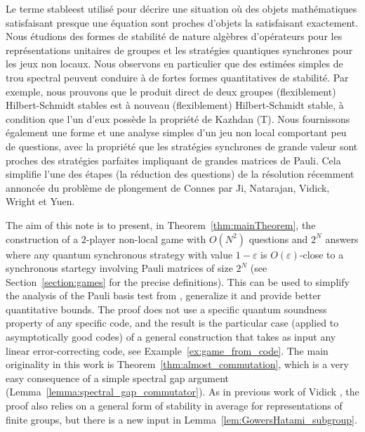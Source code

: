 \documentclass[JEP,XML,SOM,Unicode,published]{cedram}
\theoremstyle{plain}
\theoremstyle{definition}
\begin{document}
\begin{altabstract}
Le terme \og stable\fg est utilisé pour décrire une situation où des objets mathématiques satisfaisant presque une équation sont proches d'objets la satisfaisant exactement. Nous étudions des formes de stabilité de nature algèbres d'opérateurs pour les représentations unitaires de groupes et les stratégies quantiques synchrones pour les jeux non locaux. Nous observons en particulier que des estimées simples de trou spectral peuvent conduire à de fortes formes quantitatives de stabilité. Par exemple, nous prouvons que le produit direct de deux groupes (flexiblement) Hilbert-Schmidt stables est à nouveau (flexiblement) Hilbert-Schmidt stable, à condition que l'un d'eux possède la propriété de Kazhdan (T). Nous fournissons également une forme et une analyse simples d'un jeu non local comportant peu de questions, avec la propriété que les stratégies synchrones de grande valeur sont proches des stratégies parfaites impliquant de grandes matrices de Pauli. Cela simplifie l'une des étapes (la réduction des questions) de la résolution récemment annoncée du problème de plongement de Connes par Ji, Natarajan, Vidick, Wright et Yuen.
\end{altabstract}
\maketitle

\noindent
\begin{minipage}{\textwidth}
\tableofcontents
\end{minipage}
\newpage
\mainmatter

The aim of this note is to present, in Theorem~\ref{thm:mainTheorem}, the construction of a $2$\nobreakdash-player non-local game with $O(N^2)$ questions and $2^N$ answers where any quantum synchronous strategy with value $1-\varepsilon$ is $O(\varepsilon)$-close to a synchronous startegy involving Pauli matrices of size $2^N$ (see Section~\ref{section:games} for the precise definitions). This can be used to simplify the analysis of the Pauli basis test from \cite{MIPRE}, generalize it and provide better quantitative bounds. The proof does not use a specific quantum soundness property of any specific code, and the result is the particular case (applied to asymptotically good codes) of a general construction that takes as input any linear error-correcting code, see Example~\ref{ex:game_from_code}. The main originality in this work is Theorem~\ref{thm:almost_commutation}, which is a very easy consequence of a simple spectral gap argument (Lemma~\ref{lemma:spectral_gap_commutator}). As in previous work of Vidick \cite{vidickPauliBraiding}, the proof also relies on a general form of stability in average for representations of finite groups, but there is a new input in Lemma~\ref{lem:GowersHatami_subgroup}.
\end{document}
